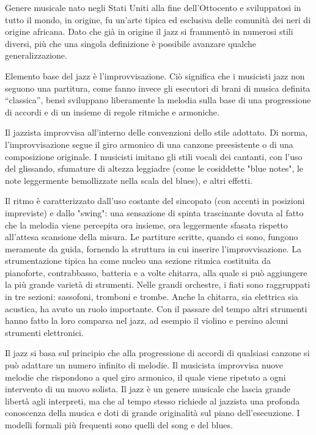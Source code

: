 Genere musicale nato negli Stati Uniti alla fine dell'Ottocento e sviluppatosi in tutto il mondo, in origine, fu un’arte tipica ed esclusiva delle comunità dei neri di origine africana. Dato che già in origine il jazz si frammentò in numerosi stili diversi, più che una singola definizione è possibile avanzare qualche generalizzazione.

Elemento base del jazz è l’improvvisazione. Ciò significa che i musicisti jazz non seguono una partitura, come fanno invece gli esecutori di brani di musica definita “classica”, bensì sviluppano liberamente la melodia sulla base di una progressione di accordi e di un insieme di regole ritmiche e armoniche.

Il jazzista improvvisa all'interno delle convenzioni dello stile adottato. Di norma, l'improvvisazione segue il giro armonico di una canzone preesistente o di una composizione originale. I musicisti imitano gli stili vocali dei cantanti, con l'uso del glissando, sfumature di altezza leggiadre (come le cosiddette "blue notes", le note leggermente bemollizzate nella scala del blues), e altri effetti.

Il ritmo è caratterizzato dall'uso costante del sincopato (con accenti in posizioni impreviste) e dallo "swing": una sensazione di spinta trascinante dovuta al fatto che la melodia viene percepita ora insieme, ora leggermente sfasata rispetto all'attesa scansione della misura. Le partiture scritte, quando ci sono, fungono meramente da guida, fornendo la struttura in cui inserire l'improvvisazione. La strumentazione tipica ha come nucleo una sezione ritmica costituita da pianoforte, contrabbasso, batteria e a volte chitarra, alla quale si può aggiungere la più grande varietà di strumenti. Nelle grandi orchestre, i fiati sono raggruppati in tre sezioni: sassofoni, tromboni e trombe. Anche la chitarra, sia elettrica sia acustica, ha avuto un ruolo importante. Con il passare del tempo altri strumenti hanno fatto la loro comparsa nel jazz, ad esempio il violino e persino alcuni strumenti elettronici.

Il jazz si basa sul principio che alla progressione di accordi di qualsiasi canzone si può adattare un numero infinito di melodie. Il musicista improvvisa nuove melodie che rispondono a quel giro armonico, il quale viene ripetuto a ogni intervento di un nuovo solista. Il jazz è un genere musicale che lascia grande libertà agli interpreti, ma che al tempo stesso richiede al jazzista una profonda conoscenza della musica e doti di grande originalità sul piano dell’esecuzione. I modelli formali più frequenti sono quelli del song e del blues.

